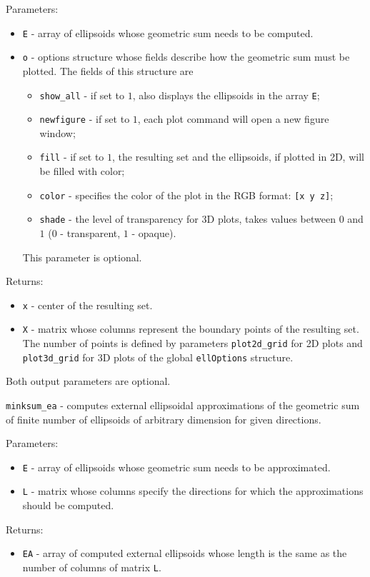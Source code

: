 \documentclass{report}
\begin{document}
Parameters:
\begin{itemize}
\item {\tt E} - array of ellipsoids whose geometric sum needs to be computed.
\item {\tt o} - options structure whose fields describe how the geometric
sum must be plotted. The fields of this structure are
\begin{itemize}
\item {\tt show\_all} - if set to $1$, also displays the ellipsoids in the
array {\tt E};
\item {\tt newfigure} - if set to $1$, each plot command will open a new
figure window;
\item {\tt fill} - if set to $1$, the resulting set and the ellipsoids,
if plotted in 2D, will be filled with color;
\item {\tt color} - specifies the color of the plot in the RGB format:
{\tt [x y z]};
\item {\tt shade} - the level of transparency for 3D plots, takes values
between $0$ and $1$ ($0$ - transparent, $1$ - opaque).
\end{itemize}
This parameter is optional.
\end{itemize}

Returns:
\begin{itemize}
\item {\tt x} - center of the resulting set.
\item {\tt X} - matrix whose columns represent the boundary points of the
resulting set. The number of points is defined by parameters
{\tt plot2d\_grid} for 2D plots and {\tt plot3d\_grid} for 3D plots of the
global {\tt ellOptions} structure.
\end{itemize}
Both output parameters are optional.

\newpage

{\Large {\tt minksum\_ea}} - computes external ellipsoidal approximations
of the geometric sum of finite number of ellipsoids of arbitrary dimension
for given directions.

Parameters:
\begin{itemize}
\item {\tt E} - array of ellipsoids whose geometric sum needs to be
approximated.
\item {\tt L} - matrix whose columns specify the directions for which
the approximations should be computed.
\end{itemize}

Returns:
\begin{itemize}
\item {\tt EA} - array of computed external ellipsoids whose length is the same
as the number of columns of matrix {\tt L}.
\end{itemize}
\end{document}
